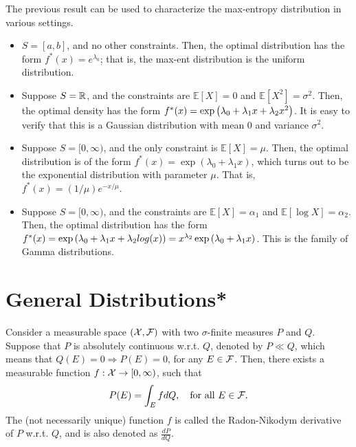         \begin{example}
            \label{example:max-entropy} The previous result can be used to characterize the max-entropy distribution in various settings. 
            \begin{itemize}
                \item $S=[a, b]$, and no other constraints. Then, the optimal distribution has the form $f^*(x) = e^{\lambda_0}$; that is, the max-ent distribution is the uniform distribution. 
                \item Suppose $S=\mathbb{R}$, and the constraints are $\mathbb{E}[X] = 0$ and $\mathbb{E}[X^2]=\sigma^2$. Then, the optimal density has the form $f^*(x) = \exp \left( \lambda_0 + \lambda_1 x + \lambda_2 x^2 \right)$. It is easy to verify that this is a Gaussian distribution with mean $0$ and variance $\sigma^2$. 
                \item Suppose $S = [0, \infty)$, and the only constraint is $\mathbb{E}[X] = \mu$. Then, the optimal distribution is of the form $f^*(x) = \exp (\lambda_0 + \lambda_1 x)$, which turns out to be the exponential distribution with parameter $\mu$. That is, $f^*(x) = (1/\mu)e^{-x/\mu}$.  
                \item Suppose $S=[0, \infty)$, and the constraints are $\mathbb{E}[X]=\alpha_1$ and $\mathbb{E}[\log X] = \alpha_2$. Then, the optimal distribution has the form $f^*(x) = \exp \left( \lambda_0 + \lambda_1 x + \lambda_2 log(x) \right) = x^{\lambda_2} \exp \left( \lambda_0 + \lambda_1 x \right)$. This is the family of Gamma distributions. 
            \end{itemize}
            
        \end{example}
        
    \section{General Distributions*}
        \begin{fact}
            \label{fact:radon-nikodym}
            Consider a measurable space $(\mathcal{X}, \mathcal{F})$ with two $\sigma$-finite  measures $P$ and $Q$. Suppose that $P$ is absolutely continuous w.r.t. $Q$, denoted by $P \ll Q$, which means that $Q(E)=0 \Rightarrow P(E)=0$, for any $E \in \mathcal{F}$. Then, there exists a measurable function $f: \mathcal{X} \to [0, \infty)$, such that 
            \begin{align}
                P(E) = \int_{E} f dQ, \quad \text{for all } E \in \mathcal{F}. 
            \end{align}
            The (not necessarily unique) function $f$ is called the Radon-Nikodym derivative of $P$ w.r.t. $Q$, and is also denoted as $\frac{dP}{dQ}$.  
        \end{fact}

